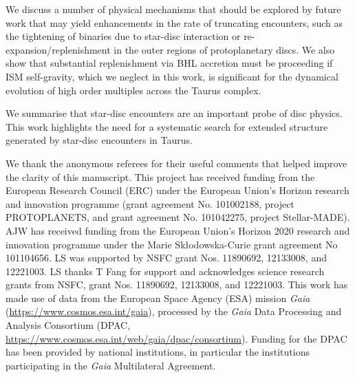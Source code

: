 \documentclass{aa}
\begin{document}
We discuss a number of physical mechanisms that should be explored by future work that may yield enhancements in the rate of truncating encounters, such as the tightening of binaries due to star-disc interaction \citep[e.g.][]{Munoz15} or re-expansion/replenishment in the outer regions of protoplanetary discs.{ We also show that substantial replenishment via BHL accretion must be proceeding if ISM self-gravity, which we neglect in this work, is significant for the dynamical evolution of high order multiples across the Taurus complex. }

We summarise that star-disc encounters are an important probe of disc physics. This work highlights the need for a systematic search for extended structure generated by star-disc encounters in Taurus. 


\begin{acknowledgements}{We thank the anonymous referees for their useful comments that helped improve the clarity of this manuscript.} This project has received funding from the European Research Council (ERC) under the European Union’s Horizon research and innovation programme (grant agreement No. 101002188, project PROTOPLANETS, and grant agreement No. 101042275, project Stellar-MADE).
AJW has received funding from the European Union’s Horizon 2020 research and innovation programme under the Marie Skłodowska-Curie grant agreement No 101104656. LS was supported by NSFC grant Nos. 11890692, 12133008, and 12221003. LS thanks T Fang for support and acknowledges science research grants from NSFC, grant Nos. 11890692, 12133008, and 12221003. This work has made use of data from the European Space Agency (ESA) mission {\it Gaia} (\url{https://www.cosmos.esa.int/gaia}), processed by the {\it Gaia} Data Processing and Analysis Consortium (DPAC, \url{https://www.cosmos.esa.int/web/gaia/dpac/consortium}). Funding for the DPAC has been provided by national institutions, in particular the institutions participating in the {\it Gaia} Multilateral Agreement.
\end{acknowledgements}




\appendix
\end{document}
